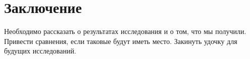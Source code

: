 \section{Заключение}
\label{sec:Chapter6} 

Необходимо рассказать о результатах исследования и о том, что мы получили. Привести сравнения, если таковые будут иметь место. Закинуть удочку для будущих исследований.

\newpage